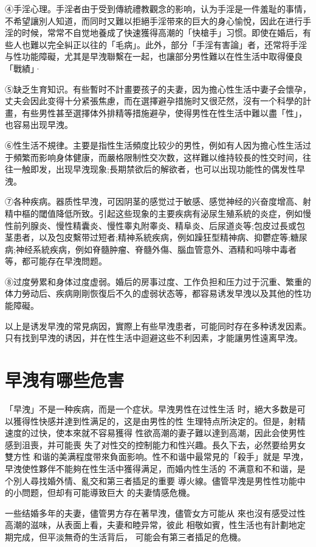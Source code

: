 \documentclass[12pt,UTF8]{ctexbook}
\begin{document}
④手淫心理。手淫者由于受到傳統禮教觀念的影响，认为手淫是一件羞耻的事情，不希望讓別人知道，而同时又難以拒絕手淫带來的巨大的身心愉悅，因此在进行手淫的时候，常常不自觉地養成了快速獲得高潮的「快槍手」习惯。即使在婚后，有些人也難以完全糾正以往的「毛病」。此外，部分「手淫有害論」者，还常将手淫与性功能障礙，尤其是早洩聯繫在一起，也讓部分男性難以在性生活中取得優良「戰績」·

⑤缺乏生育知识。有些暫时不計畫要孩子的夫妻，因为擔心性生活中妻子会懷孕，丈夫会因此变得十分紧張焦慮，而在選擇避孕措施时又很茫然，沒有一个科學的計畫，有些男性甚至選擇体外排精等措施避孕，使得男性在性生活中難以盡「性」，也容易出现早洩。

⑥性生活不規律。主要是指性生活頻度比较少的男性，例如有人因为擔心性生活过于頻繁而影响身体健康，而嚴格限制性交次数，这样難以维持较長的性交时间，往往一触即发，出现早洩现象;長期禁欲后的解欲者，也可以出现功能性的偶发性早洩。

⑦各种疾病。器质性早洩，可因阴茎的感觉过于敏感、感觉神经的兴奋度增高、射精中樞的閾值降低所致。引起这些现象的主要疾病有泌尿生殖系統的炎症，例如慢性前列腺炎、慢性精囊炎、慢性睾丸附睾炎、精阜炎、后尿道炎等;包皮过長或包茎患者，以及包皮繫带过短者;精神系統疾病，例如躁狂型精神病、抑鬱症等;糖尿病;神经系統疾病，例如脊髓肿瘤、脊髓外傷、腦血管意外、酒精和吗啡中毒者等，都可能存在早洩問题。

⑧过度勞累和身体过度虚弱。婚后的房事过度、工作负担和压力过于沉重、繁重的体力勞动后、疾病剛剛恢復后不久的虚弱状态等，都容易诱发早洩以及其他的性功能障礙。

以上是诱发早洩的常見病因，實際上有些早洩患者，可能同时存在多种诱发因素。只有找到早洩的诱因，并在性生活中迴避这些不利因素，才能讓男性遠离早洩。

\section{早洩有哪些危害}

「早洩」不是一种疾病，而是一个症状。早洩男性在过性生活
时，絕大多数是可以獲得性快感并達到性满足的，这是由男性的性
生理特点所決定的。但是，射精速度的过快，使本來就不容易獲得
性欲高潮的妻子難以達到高潮，因此会使男性感到沮喪，并可能喪
失了对性交的控制能力和性兴趣。長久下去，必然要给男女雙方性
和谐的美满程度带來負面影响。性不和谐中最常見的「殺手」就是
早洩，早洩使性夥伴不能夠在性生活中獲得满足，而婚内性生活的
不满意和不和谐，是个別人尋找婚外情、亂交和第三者插足的重要
導火線。儘管早洩是男性性功能中的小問题，但却有可能導致巨大
的夫妻情感危機。

一些结婚多年的夫妻，儘管男方存在著早洩，儘管女方可能从
來也沒有感受过性高潮的滋味，从表面上看，夫妻和睦异常，彼此
相敬如賓，性生活也有計劃地定期完成，但平淡無奇的生活背后，
可能会有第三者插足的危機。
\end{document}
